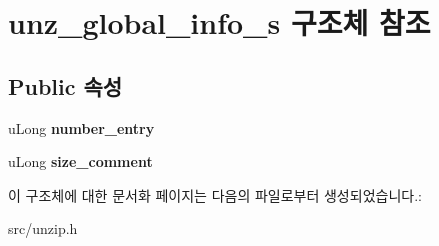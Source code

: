 \hypertarget{structunz__global__info__s}{}\section{unz\+\_\+global\+\_\+info\+\_\+s 구조체 참조}
\label{structunz__global__info__s}
\subsection*{Public 속성}
\begin{DoxyCompactItemize}
\item 
\mbox{\label{structunz__global__info__s_a827d1cd1d09f12acd6c2ee12494cb320}} 
u\+Long {\bfseries number\+\_\+entry}
\item 
\mbox{\label{structunz__global__info__s_a10b58ab57b62301de813ecac0e974363}} 
u\+Long {\bfseries size\+\_\+comment}
\end{DoxyCompactItemize}


이 구조체에 대한 문서화 페이지는 다음의 파일로부터 생성되었습니다.\+:\begin{DoxyCompactItemize}
\item 
src/unzip.\+h\end{DoxyCompactItemize}
